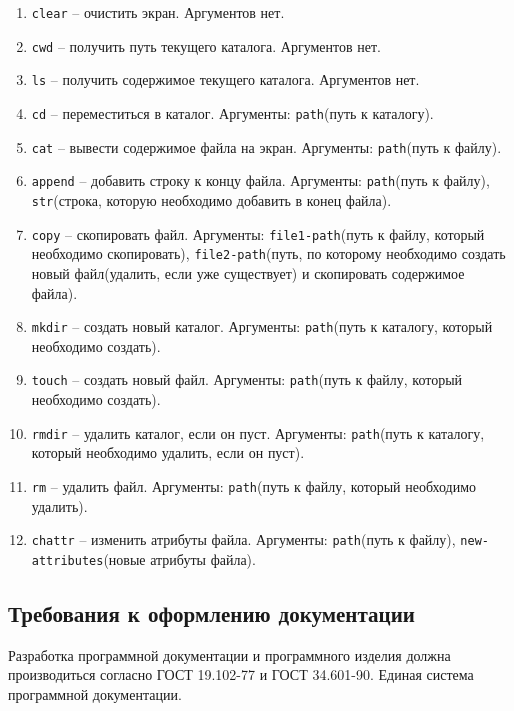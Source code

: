 \begin{enumerate}
\item \texttt{clear} -- очистить экран. Аргументов нет.
\item \texttt{cwd} -- получить путь текущего каталога. Аргументов нет.
\item \texttt{ls} -- получить содержимое текущего каталога. Аргументов нет.
\item \texttt{cd} -- переместиться в каталог. Аргументы: \texttt{path}(путь к каталогу).
\item \texttt{cat} -- вывести содержимое файла на экран. Аргументы: \texttt{path}(путь к файлу).
\item \texttt{append} -- добавить строку к концу файла. Аргументы: \texttt{path}(путь к файлу), \texttt{str}(строка, которую необходимо добавить в конец файла).
\item \texttt{copy} -- скопировать файл. Аргументы: \texttt{file1-path}(путь к файлу, который необходимо скопировать), \texttt{file2-path}(путь, по которому необходимо создать новый файл(удалить, если уже существует) и скопировать содержимое файла).
\item \texttt{mkdir} -- создать новый каталог. Аргументы: \texttt{path}(путь к каталогу, который необходимо создать). 
\item \texttt{touch} -- создать новый файл. Аргументы: \texttt{path}(путь к файлу, который необходимо создать).
\item \texttt{rmdir} -- удалить каталог, если он пуст. Аргументы: \texttt{path}(путь к каталогу, который необходимо удалить, если он пуст).
\item \texttt{rm} -- удалить файл. Аргументы: \texttt{path}(путь к файлу, который необходимо удалить).
\item \texttt{chattr} -- изменить атрибуты файла. Аргументы: \texttt{path}(путь к файлу), \texttt{new-attributes}(новые атрибуты файла).
\end{enumerate}

\subsection{Требования к оформлению документации}

Разработка программной документации и программного изделия должна производиться согласно ГОСТ 19.102-77 и ГОСТ 34.601-90. Единая система программной документации.
